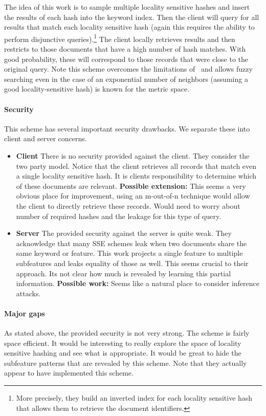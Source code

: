 The idea of this work is to sample multiple locality sensitive hashes and insert the results of each hash into the keyword index.  Then the client will query for all results that match each locality sensitive hash (again this requires the ability to perform disjunctive queries).\footnote{More precisely, they build an inverted index for each locality sensitive hash that allows them to retrieve the document identifiers.}  The client locally retrieves results and then restricts to those documents that have a high number of hash matches.  With good probability, these will correspond to those records that were close to the original query.  Note this scheme overcomes the limitations of~\cite{li2010fuzzy} and allows fuzzy searching even in the case of an exponential number of neighbors (assuming a good locality-sensitive hash) is known for the metric space.

\paragraph{Security}  This scheme has several important security drawbacks.  We separate these into client and server concerns.

\begin{itemize}
\item \textbf{Client} There is no security provided against the client.  They consider the two party model.  Notice that the client retrieves all records that match even a single locality sensitive hash.  It is clients responsibility to determine which of these documents are relevant.  \textbf{Possible extension:} This seems a very obvious place for improvement, using an m-out-of-n technique would allow the client to directly retrieve these records.  Would need to worry about number of required hashes and the leakage for this type of query.
\item \textbf{Server} The provided security against the server is quite weak.  They acknowledge that many SSE schemes leak when two documents share the same keyword or feature.  This work projects a single feature to multiple subfeatures and leaks equality of those as well.  This seems crucial to their approach.  Its not clear how much is revealed by learning this partial information.  \textbf{Possible work:} Seems like a natural place to consider inference attacks.
\end{itemize}

\paragraph{Major gaps} As stated above, the provided security is not very strong.  The scheme is fairly space efficient.  It would be interesting to really explore the space of locality sensitive hashing and see what is appropriate.  It would be great to hide the subfeature patterns that are revealed by this scheme.  Note that they actually appear to have implemented this scheme.

